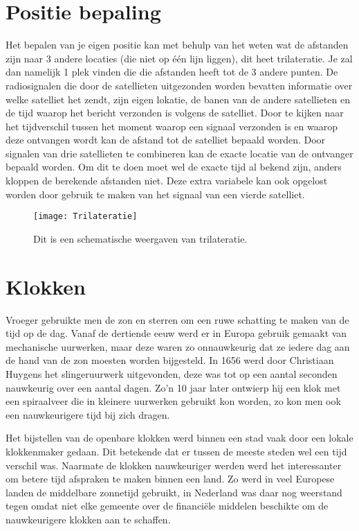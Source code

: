 \section{Positie bepaling}

Het bepalen van je eigen positie kan met behulp van het weten wat de
afstanden zijn naar 3 andere locaties (die niet op één lijn liggen), dit
heet trilateratie. Je zal dan namelijk 1 plek vinden die die afstanden
heeft tot de 3 andere punten. De radiosignalen die door de satellieten
uitgezonden worden bevatten informatie over welke satelliet het zendt,
zijn eigen lokatie, de banen van de andere satellieten en de tijd waarop
het bericht verzonden is volgens de satelliet. Door te kijken naar het
tijdverschil tussen het moment waarop een signaal verzonden is en waarop
deze ontvangen wordt kan de afstand tot de satelliet bepaald worden.
Door signalen van drie satellieten te combineren kan de exacte locatie
van de ontvanger bepaald worden. Om dit te doen moet wel de exacte tijd
al bekend zijn, anders kloppen de berekende afstanden niet. Deze extra
variabele kan ook opgelost worden door gebruik te maken van het signaal
van een vierde satelliet.

\begin{figure}
    \centering
    \texttt{[image: Trilateratie]}
    \caption{Dit is een schematische weergaven van trilateratie.}
    \label{fig:Trilateratie}
\end{figure}


\section{Klokken}

Vroeger gebruikte men de zon en sterren om een ruwe schatting te maken
van de tijd op de dag. Vanaf de dertiende eeuw werd er in Europa gebruik
gemaakt van mechanische uurwerken, maar deze waren zo onnauwkeurig dat
ze iedere dag aan de hand van de zon moesten worden bijgesteld. In 1656
werd door Christiaan Huygens het slingeruurwerk uitgevonden, deze was
tot op een aantal seconden nauwkeurig over een aantal dagen. Zo'n 10
jaar later ontwierp hij een klok met een spiraalveer die in kleinere
uurwerken gebruikt kon worden, zo kon men ook een nauwkeurigere tijd bij
zich dragen.

Het bijstellen van de openbare klokken werd binnen een stad vaak door
een lokale klokkenmaker gedaan. Dit betekende dat er tussen de meeste
steden wel een tijd verschil was. Naarmate de klokken nauwkeuriger
werden werd het interessanter om betere tijd afspraken te maken binnen
een land. Zo werd in veel Europese landen de middelbare zonnetijd
gebruikt, in Nederland was daar nog weerstand tegen omdat niet elke
gemeente over de financiële middelen beschikte om de nauwkeurigere
klokken aan te schaffen.


